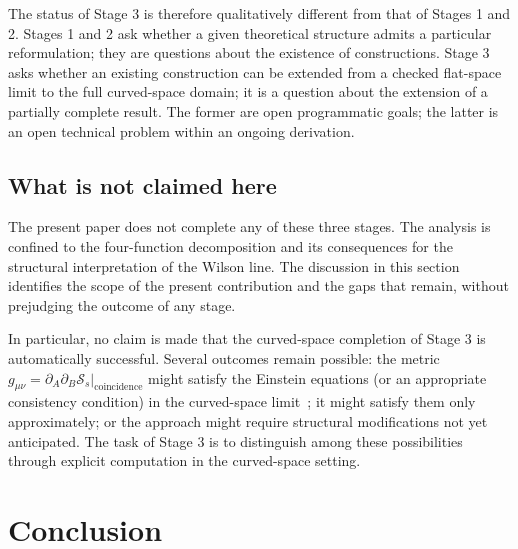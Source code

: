 \documentclass[%
 reprint, amsmath,amssymb, aps, prb, ]{revtex4-2}
\numberwithin{equation}{section}
\begin{document}
The status of Stage 3 is therefore qualitatively different from that of Stages 1 and 2. Stages 1 and 2 ask whether a given theoretical structure admits a particular reformulation; they are questions about the existence of constructions. Stage 3 asks whether an existing construction can be extended from a checked flat-space limit to the full curved-space domain; it is a question about the extension of a partially complete result. The former are open programmatic goals; the latter is an open technical problem within an ongoing derivation.

\subsection{What is not claimed here}

The present paper does not complete any of these three stages. The analysis is confined to the four-function decomposition and its consequences for the structural interpretation of the Wilson line. The discussion in this section identifies the scope of the present contribution and the gaps that remain, without prejudging the outcome of any stage.

In particular, no claim is made that the curved-space completion of Stage 3 is automatically successful. Several outcomes remain possible: the metric $g_{\mu\nu} = \partial_A\partial_B\mathcal{S}_s|_{\text{coincidence}}$ might satisfy the Einstein equations (or an appropriate consistency condition) in the curved-space limit~\cite{hanamura30}; it might satisfy them only approximately; or the approach might require structural modifications not yet anticipated. The task of Stage 3 is to distinguish among these possibilities through explicit computation in the curved-space setting.

\section{Conclusion}
\label{sec:conclusion}
\end{document}

